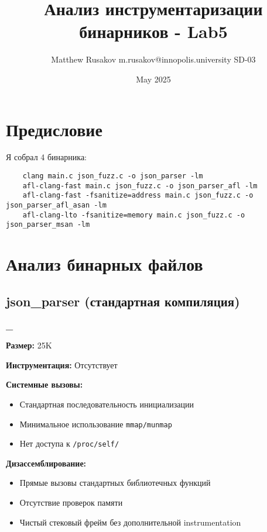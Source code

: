 \usepackage[utf8]{inputenc}
\usepackage[T2]{fontenc}
\usepackage{graphicx}
\usepackage{hyperref}
\usepackage{listings}
\usepackage{xcolor}
\usepackage[russian]{babel}
\usepackage{geometry}

\title{Анализ инструментаризации бинарников - Lab5}
\author{Matthew Rusakov m.rusakov@innopolis.university SD-03}
\date{May 2025}



    \maketitle

    \section*{Предисловие}

    Я собрал 4 бинарника:

    \begin{verbatim}
    clang main.c json_fuzz.c -o json_parser -lm
    afl-clang-fast main.c json_fuzz.c -o json_parser_afl -lm
    afl-clang-fast -fsanitize=address main.c json_fuzz.c -o json_parser_afl_asan -lm
    afl-clang-lto -fsanitize=memory main.c json_fuzz.c -o json_parser_msan -lm
    \end{verbatim}


    \section{Анализ бинарных файлов}

    \subsection{json\_parser (стандартная компиляция)}
    \textbf{\_}

    \textbf{Размер:} 25K

    \textbf{Инструментация:} Отсутствует

    \textbf{Системные вызовы:}
    \begin{itemize}
        \item Стандартная последовательность инициализации
        \item Минимальное использование \texttt{mmap/munmap}
        \item Нет доступа к \texttt{/proc/self/}
    \end{itemize}

    \textbf{Дизассемблирование:}
    \begin{itemize}
        \item Прямые вызовы стандартных библиотечных функций
        \item Отсутствие проверок памяти
        \item Чистый стековый фрейм без дополнительной instrumentation
    \end{itemize}

